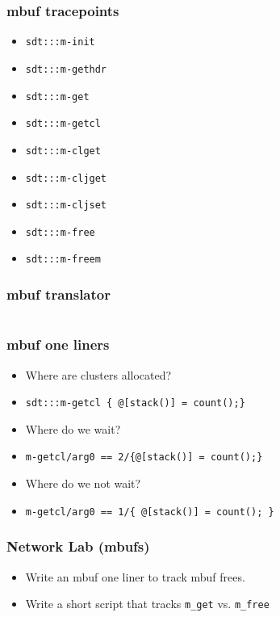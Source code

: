 \documentclass[pdftex]{beamer}
\begin{document}
\begin{frame}[fragile]
  \frametitle{mbuf tracepoints}
  \begin{itemize}
  \item \verb|sdt:::m-init|
  \item \verb|sdt:::m-gethdr|
  \item \verb|sdt:::m-get|
  \item \verb|sdt:::m-getcl|
  \item \verb|sdt:::m-clget|
  \item \verb|sdt:::m-cljget|
  \item \verb|sdt:::m-cljset|
  \item \verb|sdt:::m-free|
  \item \verb|sdt:::m-freem|
  \end{itemize}
\end{frame}

\begin{frame}[fragile]
  \frametitle{mbuf translator}
\begin{lstlisting}
\end{lstlisting}
\end{frame}

\begin{frame}[fragile]
  \frametitle{mbuf one liners}
  \begin{itemize}
  \item Where are clusters allocated?
  \item \verb|sdt:::m-getcl { @[stack()] = count();}|
  \item Where do we wait?
  \item \verb|m-getcl/arg0 == 2/{@[stack()] = count();}|
  \item Where do we not wait?
  \item \verb|m-getcl/arg0 == 1/{ @[stack()] = count(); }|
  \end{itemize}
\end{frame}

\begin{frame}[fragile]
  \frametitle{Network Lab (mbufs)}
  \begin{itemize}
  \item Write an mbuf one liner to track mbuf frees.
  \item Write a short script that tracks \verb|m_get| vs. \verb|m_free|
  \end{itemize}
\end{frame}
\end{document}
